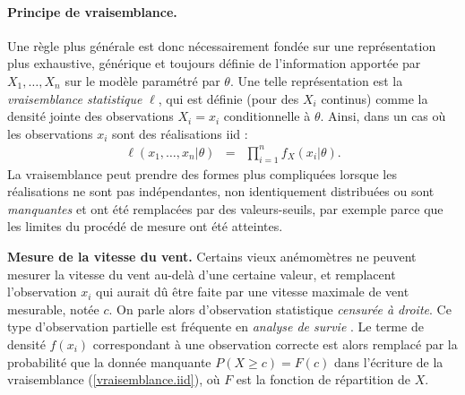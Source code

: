 \paragraph*{Principe de vraisemblance.}  
Une r\`egle plus g\'en\'erale est donc n\'ecessairement fond\'ee sur une repr\'esentation plus exhaustive, g\'en\'erique et toujours d\'efinie de l'information apport\'ee par $X_1,\ldots,X_n$ sur le mod\`ele param\'etr\'e par $\theta$. Une telle repr\'esentation est la {\it vraisemblance statistique} $\ell$, qui est d\'efinie (pour des $X_i$ continus) comme la densit\'e jointe des observations $X_i=x_i$ conditionnelle \`a $\theta$. Ainsi,  dans un cas o\`u les observations $x_i$ sont des r\'ealisations iid :
\begin{eqnarray}
\ell(x_1,\ldots,x_n|\theta) & = & \prod\limits_{i=1}^n f_{X}(x_i|\theta). \label{vraisemblance.iid}
\end{eqnarray}  
La vraisemblance peut prendre des formes plus compliqu\'ees lorsque les r\'ealisations ne sont pas ind\'ependantes, non identiquement distribu\'ees %
ou sont {\it manquantes} et ont \'et\'e remplac\'ees par des valeurs-seuils, par exemple parce que les limites du proc\'ed\'e de mesure ont \'et\'e atteintes. \\

\begin{exo}\label{censure.vent}{\bf Mesure de la vitesse du vent.} 
\noindent Certains vieux an\'emom\`etres ne peuvent mesurer la vitesse du vent au-del\`a d'une certaine valeur, et remplacent l'observation $x_i$ qui aurait d\^u \^etre faite par une vitesse maximale de vent mesurable, not\'ee $c$. On parle alors d'observation statistique {\it censur\'ee \`a droite}. Ce type d'observation partielle est fr\'equente en {\it analyse de survie} \cite{Mann1974}. Le terme de densit\'e $f(x_i)$ correspondant \`a une observation correcte est alors remplac\'e par la probabilit\'e que la donn\'ee manquante $P(X\geq c)=F(c)$ dans l'\'ecriture de la vraisemblance (\ref{vraisemblance.iid}), o\`u $F$ est la fonction de r\'epartition de $X$. 
\end{exo}

